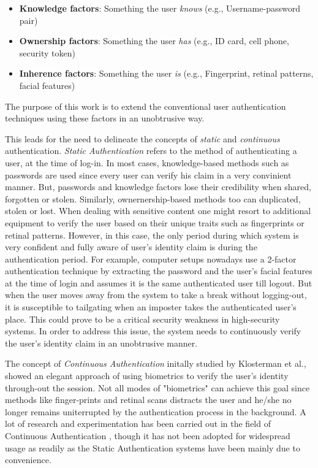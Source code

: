 \documentclass[%
        final,
        notitlepage,
        narroweqnarray,
        inline,
        ]{ieee}
\begin{document}
\begin{itemize}
	\item \textbf{Knowledge factors}: Something the user \emph{knows} (e.g., Username-password pair)
	\item \textbf{Ownership factors}: Something the user \emph{has} (e.g., ID card, cell phone, security token)
	\item \textbf{Inherence factors}: Something the user \emph{is} (e.g., Fingerprint, retinal patterns, facial features)
\end{itemize}

The purpose of this work is to extend the conventional user authentication techniques using these factors in an unobtrusive way.

This leads for the need to delineate the concepts of \emph{static} and \emph{continuous} authentication.
\emph{Static Authentication} refers to the method of authenticating a user, at the time of log-in.
In most cases, knowledge-based methods such as passwords are used since every user can verify his claim in a very convinient manner.
But, passwords and knowledge factors lose their credibility when shared, forgotten or stolen.
Similarly, ownernership-based methods too can duplicated, stolen or lost.
When dealing with sensitive content one might resort to additional equipment to verify the user based on their unique traits such as fingerprints or retinal patterns.
However, in this case, the only period during which system is very confident and fully aware of user's identity claim is during the authentication period.
For example, computer setups nowadays use a 2-factor authentication technique by extracting the password and the user's facial features at the time of login and assumes it is the same authenticated user till logout.
But when the user moves away from the system to take a break without logging-out, it is susceptible to tailgating when an imposter takes the authenticated user's place.
This could prove to be a critical security weakness in  high-security systems.
In order to address this issue, the system needs to continuously verify the user's identity claim in an unobtrusive manner.

The concept of \emph{Continuous Authentication} initally studied by Klosterman et al.\cite{Klos00}, showed an elegant approach of using biometrics to verify the user's identity through-out the session.
Not all modes of "biometrics" can achieve this goal since methods like finger-prints and retinal scans distracts the user and he/she no longer remains uniterrupted by the authentication process in the background.
A lot of research and experimentation has been carried out in the field of Continuous Authentication \cite{Niin10,Klos00,mon00,turk03,sim07,azz08,azz082}, though it has not been adopted for widespread usage as readily as the Static Authentication systems have been mainly due to convenience.
\end{document}
